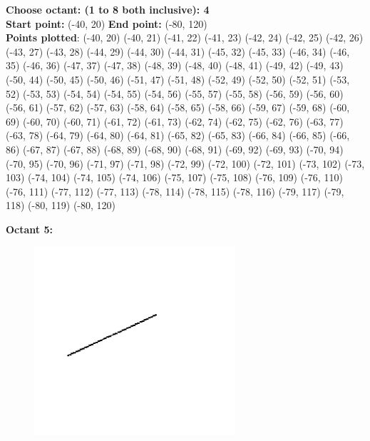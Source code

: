 \documentclass[12pt,letterpaper]{article}
\begin{document}
\textbf{Choose octant: (1 to 8 both inclusive): 4}\\
\textbf{Start point:} (-40, 20)
\textbf{End point:} (-80, 120)\\
\textbf{Points plotted}:
(-40, 20) (-40, 21) (-41, 22) (-41, 23) 
(-42, 24) (-42, 25) (-42, 26) (-43, 27) 
(-43, 28) (-44, 29) (-44, 30) (-44, 31) 
(-45, 32) (-45, 33) (-46, 34) (-46, 35) 
(-46, 36) (-47, 37) (-47, 38) (-48, 39) 
(-48, 40) (-48, 41) (-49, 42) (-49, 43) 
(-50, 44) (-50, 45) (-50, 46) (-51, 47) 
(-51, 48) (-52, 49) (-52, 50) (-52, 51) 
(-53, 52) (-53, 53) (-54, 54) (-54, 55) 
(-54, 56) (-55, 57) (-55, 58) (-56, 59) 
(-56, 60) (-56, 61) (-57, 62) (-57, 63) 
(-58, 64) (-58, 65) (-58, 66) (-59, 67) 
(-59, 68) (-60, 69) (-60, 70) (-60, 71) 
(-61, 72) (-61, 73) (-62, 74) (-62, 75) 
(-62, 76) (-63, 77) (-63, 78) (-64, 79) 
(-64, 80) (-64, 81) (-65, 82) (-65, 83) 
(-66, 84) (-66, 85) (-66, 86) (-67, 87) 
(-67, 88) (-68, 89) (-68, 90) (-68, 91) 
(-69, 92) (-69, 93) (-70, 94) (-70, 95) 
(-70, 96) (-71, 97) (-71, 98) (-72, 99) 
(-72, 100) (-72, 101) (-73, 102) (-73, 103) 
(-74, 104) (-74, 105) (-74, 106) (-75, 107) 
(-75, 108) (-76, 109) (-76, 110) (-76, 111) 
(-77, 112) (-77, 113) (-78, 114) (-78, 115) 
(-78, 116) (-79, 117) (-79, 118) (-80, 119) 
(-80, 120) 


\newpage
\textbf{Octant 5:}
\begin{figure}[h]
    \centering
    \includegraphics[height=7cm]{Outputs/O5-1.png}
\end{figure}
\end{document}

